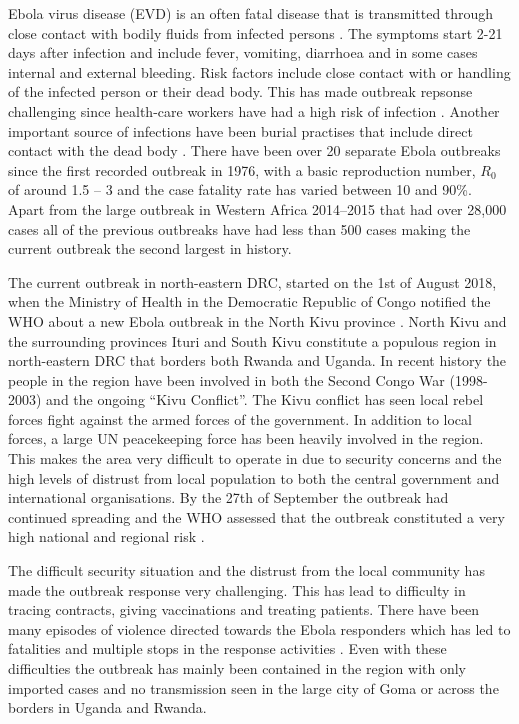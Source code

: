 \documentclass[12pt]{article}
\begin{document}
Ebola virus disease (EVD) is an often fatal disease that is transmitted through close contact with bodily fluids from infected persons \cite{worldhealthorganisationEbolaVirusDisease}. The symptoms start 2-21 days after infection and include fever, vomiting, diarrhoea and in some cases internal and external bleeding.  Risk factors include close contact with or handling of the infected person or their dead body. This has made outbreak repsonse challenging since health-care workers have had a high risk of infection \cite{brainardRiskFactorsTransmission2016}. Another important source of infections have been burial practises that include direct contact with the dead body \cite{brainardRiskFactorsTransmission2016}. There have been over 20 separate Ebola outbreaks since the first recorded outbreak in 1976, with a basic reproduction number, $R_0$ of around 1.5 -- 3 \cite{whoebolaresponseteamEbolaVirusDisease2014,legrandUnderstandingDynamicsEbola2007} and the case fatality rate has varied between 10 and 90\%. Apart from the large outbreak in Western Africa 2014--2015 that had over 28,000 cases all of the previous outbreaks have had less than 500 cases \cite{worldhealthorganisationEbolaVirusDisease} making the current outbreak the second largest in history.

The current outbreak in north-eastern DRC, started on the 1st of August 2018, when the Ministry of Health in the Democratic Republic of Congo notified the WHO about a new Ebola outbreak in the North Kivu province \cite{worldhealthorganizationEbolaOutbreakDRC2018a}. North Kivu and the surrounding provinces Ituri and South Kivu constitute a populous region in north-eastern DRC that borders both Rwanda and Uganda. In recent history the people in the region have been involved in both the Second Congo War (1998-2003) and the ongoing ``Kivu Conflict''. The Kivu conflict has seen local rebel forces fight against the armed forces of the government. In addition to local forces, a large UN peacekeeping force has been heavily involved in the region. This makes the area very difficult to operate in due to security concerns and the high levels of distrust from local population to both the central government and international organisations. By the 27th of September the outbreak had continued spreading and the WHO assessed that the outbreak constituted a very high national and regional risk \cite{worldhealthorganizationEbolaOutbreakDRC2018b}.

The difficult security situation and the distrust from the local community has made the outbreak response very challenging. This has lead to difficulty in tracing contracts, giving vaccinations and treating patients. There have been many episodes of violence directed towards the Ebola responders which has led to fatalities and multiple stops in the response activities \cite{worldhealthorganizationEbolaOutbreakDRC2018c,worldhealthorganizationEbolaOutbreakDRC2019a}. Even with these difficulties the outbreak has mainly been contained in the region with only imported cases and no transmission seen in the large city of Goma or across the borders in Uganda and Rwanda. 
\end{document}
